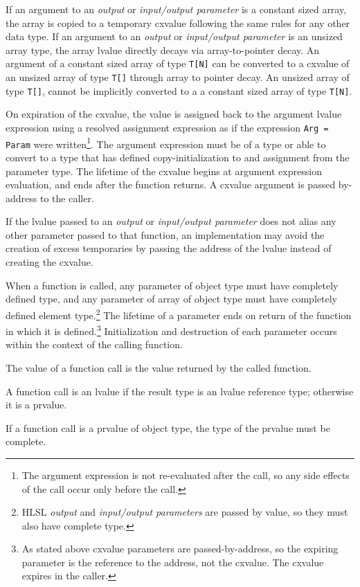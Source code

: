 \p If an argument to an \textit{output} or \textit{input/output parameter} is a
constant sized array, the array is copied to a temporary cxvalue following the
same rules for any other data type. If an argument to an \textit{output} or
\textit{input/output parameter} is an unsized array type, the array lvalue
directly decays via array-to-pointer decay. An argument of a constant sized
array of type \texttt{T[N]} can be converted to a cxvalue of an unsized array
of type \texttt{T[]} through array to pointer decay. An unsized array of type
\texttt{T[]}, cannot be implicitly converted to a a constant sized array of type
\texttt{T[N]}.

\p On expiration of the cxvalue, the value is assigned back to the argument
lvalue expression using a resolved assignment expression as if the expression
\texttt{Arg = Param} were written\footnote{The argument expression is not
re-evaluated after the call, so any side effects of the call occur only before
the call.}. The argument expression must be of a type or able to convert to a
type that has defined copy-initialization to and assignment from the parameter
type. The lifetime of the cxvalue begins at argument expression evaluation, and
ends after the function returns. A cxvalue argument is passed by-address to the
caller.

\p If the lvalue passed to an \textit{output} or \textit{input/output parameter}
does not alias any other parameter passed to that function, an implementation
may avoid the creation of excess temporaries by passing the address of the
lvalue instead of creating the cxvalue.

\p When a function is called, any parameter of object type must have completely
defined type, and any parameter of array of object type must have completely
defined element type.\footnote{HLSL \textit{output} and \textit{input/output
parameters} are passed by value, so they must also have complete type.} The
lifetime of a parameter ends on return of the function in which it is
defined.\footnote{As stated above cxvalue parameters are passed-by-address, so
the expiring parameter is the reference to the address, not the cxvalue. The
cxvalue expires in the caller.} Initialization and destruction of each
parameter occurs within the context of the calling function.

\p The value of a function call is the value returned by the called function.

\p A function call is an lvalue if the result type is an lvalue reference type;
otherwise it is a prvalue.

\p If a function call is a prvalue of object type, the type of the prvalue must
be complete.
